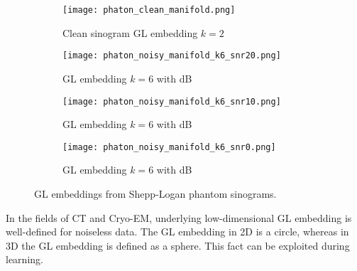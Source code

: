 \begin{figure}[H]
    \captionsetup[subfigure]{justification=centering}
    \centering
    \begin{subfigure}[t]{0.25\textwidth}
        \texttt{[image: phaton\_clean\_manifold.png]}
        \caption{Clean sinogram GL embedding $k=2$}
        \label{fig:clean_manifold}
    \end{subfigure}\hfill
    \begin{subfigure}[t]{0.25\textwidth}
      \texttt{[image: phaton\_noisy\_manifold\_k6\_snr20.png]}
      \caption{GL embedding $k=6$ with  dB}
      \label{fig:noisy_manifold_k6_snr20}
    \end{subfigure}\hfill
    \begin{subfigure}[t]{0.25\textwidth}
      \texttt{[image: phaton\_noisy\_manifold\_k6\_snr10.png]}
      \caption{GL embedding $k=6$ with  dB}
      \label{fig:noisy_manifold_k6_snr10}
    \end{subfigure}\hfill
    \begin{subfigure}[t]{0.25\textwidth}
      \texttt{[image: phaton\_noisy\_manifold\_k6\_snr0.png]}
      \caption{GL embedding $k=6$ with  dB}
      \label{fig:noisy_manifold_k6_snr0}
    \end{subfigure}
    \caption{GL embeddings from Shepp-Logan phantom sinograms.}
    \label{fig:phantom_manifolds}
  \end{figure}

\begin{tcolorbox}[colback=red!5!white,colframe=red!75!black]
    In the fields of CT and Cryo-EM, underlying low-dimensional GL embedding is well-defined for noiseless data.
    The GL embedding in 2D is a circle, whereas in 3D the GL embedding is defined as a sphere.
    This fact can be exploited during learning.
\end{tcolorbox}


